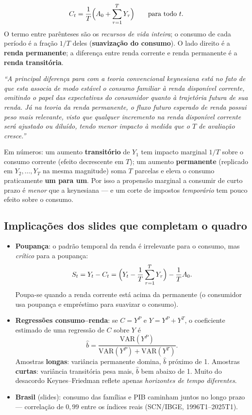 \documentclass[12pt, a4paper]{article}
\newcommand{\VAR}{\mathrm{VAR}}
\begin{document}
\begin{formulabox}[title={Função consumo da renda permanente}]
\[
C_t = \frac{1}{T}\Bigl(A_0 + \sum_{\tau=1}^{T} Y_\tau\Bigr)
\qquad\text{para todo } t.
\]
O termo entre parênteses são os \emph{recursos de vida inteira}; o consumo de
cada período é a fração $1/T$ deles (\textbf{suavização do consumo}). O lado
direito é a \textbf{renda permanente}; a diferença entre renda corrente e
renda permanente é a \textbf{renda transitória}.
\end{formulabox}

\begin{correctbox}[title={Chave oficial (Q1a): diferença para a hipótese keynesiana}]
\emph{``A principal diferença para com a teoria convencional keynesiana está no
fato de que esta associa de modo estável o consumo familiar à renda disponível
corrente, omitindo o papel das expectativas do consumidor quanto à trajetória
futura de sua renda. Já na teoria da renda permanente, o fluxo futuro esperado
de renda possui peso mais relevante, visto que qualquer incremento na renda
disponível corrente será ajustado ou diluído, tendo menor impacto à medida que
o $T$ de avaliação cresce.''}

Em números: um aumento \textbf{transitório} de $Y_1$ tem impacto marginal
$1/T$ sobre o consumo corrente (efeito decrescente em $T$); um aumento
\textbf{permanente} (replicado em $Y_2,\dots,Y_T$ na mesma magnitude) soma $T$
parcelas e eleva o consumo praticamente \textbf{um para um}. Por isso a
propensão marginal a consumir de curto prazo é \emph{menor} que a keynesiana
--- e um corte de impostos \emph{temporário} tem pouco efeito sobre o consumo.
\end{correctbox}

\subsection{Implicações dos slides que completam o quadro}

\begin{itemize}[leftmargin=1.4em]
\item \textbf{Poupança}: o padrão temporal da renda é irrelevante para o
consumo, mas \emph{crítico} para a poupança:
\[
S_t = Y_t - C_t
    = \Bigl(Y_t - \frac{1}{T}\sum_{\tau=1}^{T} Y_\tau\Bigr) - \frac{1}{T}A_0.
\]
Poupa-se quando a renda corrente está acima da permanente (o consumidor usa
poupança e empréstimo para suavizar o consumo).
\item \textbf{Regressões consumo--renda}: se $C = Y^P$ e $Y = Y^P + Y^T$, o
coeficiente estimado de uma regressão de $C$ sobre $Y$ é
\[
\hat{b} = \frac{\VAR(Y^P)}{\VAR(Y^P) + \VAR(Y^T)}.
\]
Amostras \textbf{longas}: variância permanente domina, $\hat{b}$ próximo de 1.
Amostras \textbf{curtas}: variância transitória pesa mais, $\hat{b}$ bem
abaixo de 1. Muito do desacordo Keynes--Friedman reflete apenas
\emph{horizontes de tempo diferentes}.
\item \textbf{Brasil} (slides): consumo das famílias e PIB caminham juntos no
longo prazo --- correlação de $0{,}99$ entre os índices reais (SCN/IBGE,
1996T1--2025T1).
\end{itemize}
\end{document}
